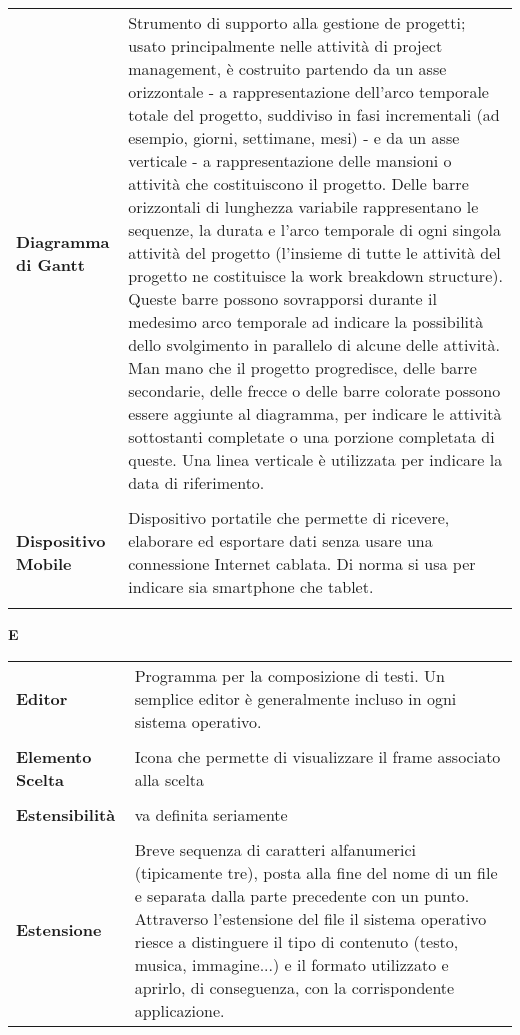 {\begin{longtable}{L{4cm} p{10cm}}
 \\ 
\textbf{Diagramma di Gantt} & Strumento di supporto alla gestione de progetti; usato principalmente nelle attività di project management, è costruito partendo da un asse orizzontale - a rappresentazione dell'arco temporale totale del progetto, suddiviso in fasi incrementali (ad esempio, giorni, settimane, mesi) - e da un asse verticale - a rappresentazione delle mansioni o attività che costituiscono il progetto. Delle barre orizzontali di lunghezza variabile rappresentano le sequenze, la durata e l'arco temporale di ogni singola attività del progetto (l'insieme di tutte le attività del progetto ne costituisce la work breakdown structure). Queste barre possono sovrapporsi durante il medesimo arco temporale ad indicare la possibilità dello svolgimento in parallelo di alcune delle attività. Man mano che il progetto progredisce, delle barre secondarie, delle frecce o delle barre colorate possono essere aggiunte al diagramma, per indicare le attività sottostanti completate o una porzione completata di queste. Una linea verticale è utilizzata per indicare la data di riferimento. \\ 
 \\ 
\textbf{Dispositivo Mobile} & Dispositivo portatile che permette di ricevere, elaborare ed esportare dati senza usare una connessione Internet cablata. Di norma si usa per indicare sia smartphone che tablet. \\ 
 \\ 
\end{longtable} 
\newpage 
{} 
{} 
\hfill\Huge{\textbf{E}} \\ 
\normalsize 
\begin{longtable}{L{4cm} p{10cm}}
\textbf{Editor} & Programma per la composizione di testi. Un semplice editor è generalmente incluso in ogni sistema operativo. \\ 
 \\ 
\textbf{Elemento Scelta} & Icona che permette di visualizzare il frame associato alla scelta \\ 
 \\ 
\textbf{Estensibilità} & va definita seriamente \\ 
 \\ 
\textbf{Estensione} & Breve sequenza di caratteri alfanumerici (tipicamente tre), posta alla fine del nome di un file e separata dalla parte precedente con un punto. Attraverso l’estensione del file il sistema operativo riesce a distinguere il tipo di contenuto (testo, musica, immagine...) e il formato utilizzato e aprirlo, di conseguenza, con la corrispondente applicazione. \\ 

\end{longtable}}
